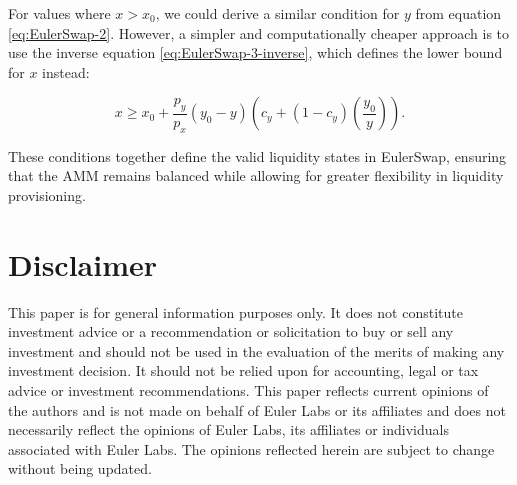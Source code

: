 \documentclass{article}
\begin{document}
For values where \( x > x_0 \), we could derive a similar condition for $y$ from equation \eqref{eq:EulerSwap-2}. However, a simpler and computationally cheaper approach is to use the inverse equation \eqref{eq:EulerSwap-3-inverse}, which defines the lower bound for $x$ instead:

\begin{equation}
    \label{eq:invariant-x2}
    x \geq x_{0}+\frac{p_{y}}{p_{x}}\left(y_{0}-y\right)\left(c_{y}+\left(1-c_{y}\right)\left(\frac{y_{0}}{y}\right)\right).
\end{equation}

These conditions together define the valid liquidity states in EulerSwap, ensuring that the AMM remains balanced while allowing for greater flexibility in liquidity provisioning.

\section{Disclaimer}

This paper is for general information purposes only. It does not constitute investment
advice or a recommendation or solicitation to buy or sell any investment and should not
be used in the evaluation of the merits of making any investment decision. It should not
be relied upon for accounting, legal or tax advice or investment recommendations. This
paper reflects current opinions of the authors and is not made on behalf of Euler Labs or its
affiliates and does not necessarily reflect the opinions of Euler Labs, its affiliates or individuals
associated with Euler Labs. The opinions reflected herein are subject to change without being
updated.
\end{document}
